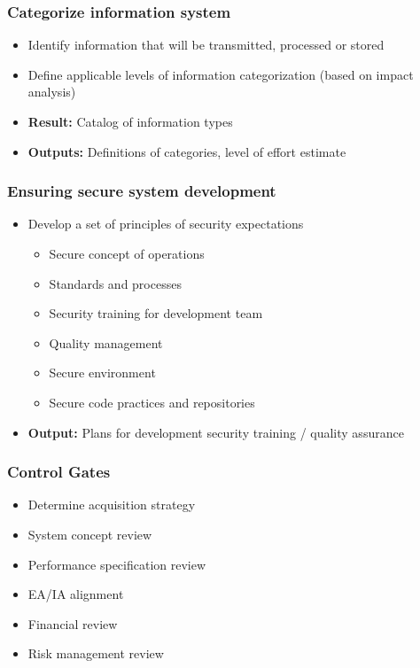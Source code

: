 \subsubsection{Categorize information system}
\begin{itemize}
    \item Identify information that will be transmitted, processed or stored
    \item Define applicable levels of information categorization (based on impact analysis)
    \item \textbf{Result:} Catalog of information types
    \item \textbf{Outputs:} Definitions of categories, level of effort estimate
\end{itemize}

\subsubsection{Ensuring secure system development}
\begin{itemize}
    \item Develop a set of principles of security expectations
    \begin{itemize}
        \item Secure concept of operations
        \item Standards and processes
        \item Security training for development team
        \item Quality management
        \item Secure environment
        \item Secure code practices and repositories
    \end{itemize}
    \item \textbf{Output:} Plans for development security training / quality assurance
\end{itemize}

\subsubsection{Control Gates}
\begin{itemize}
    \item Determine acquisition strategy
    \item System concept review
    \item Performance specification review
    \item EA/IA alignment
    \item Financial review
    \item Risk management review
\end{itemize}

